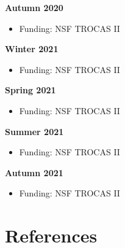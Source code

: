 \documentclass[12pt, letterpaper, twoside]{article}
\begin{document}
\textbf{Autumn 2020}

\begin{itemize}
	\item Funding: NSF TROCAS II
\end{itemize}

\textbf{Winter 2021}

\begin{itemize}
	\item Funding: NSF TROCAS II
\end{itemize}

\textbf{Spring 2021} 

\begin{itemize}
	\item Funding: NSF TROCAS II
\end{itemize}

\textbf{Summer 2021} 

\begin{itemize}
	\item Funding: NSF TROCAS II
\end{itemize}

\textbf{Autumn 2021} 

\begin{itemize}
	\item Funding: NSF TROCAS II
\end{itemize}



\newpage

\section{References}

\printbibliography[heading=none]
\end{document}
